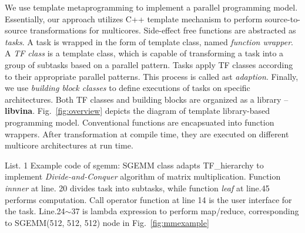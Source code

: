 We use template metaprogramming to implement a parallel programming model.
Essentially, our approach utilizes C++ template mechanism to
perform source-to-source transformations for multicores. Side-effect
free functions are abstracted as \emph{tasks}. A task is
wrapped in the form of template class, named \emph{function
  wrapper}.  A \emph{TF class} is a template class, which
is capable of transforming a task into a group of subtasks based on
a parallel pattern. Tasks
apply TF classes according to their appropriate
parallel patterns. This process is called ast \emph{adaption}. 
Finally, we use \emph{building block classes} to define executions of tasks
on specific architectures. Both TF classes and building
blocks are organized as a library --
\textbf{libvina}. Fig.~\ref{fig:overview} depicts the diagram of template
library-based programming model. Conventional functions are
encapsuated into function wrappers. After transformation at compile time, they are
executed on different multicore architectures at run time.

\renewcommand\linenumberfont{\normalfont\small}
\setlength\linenumbersep{-0.06in}





\makebox[3.4in]{\hrulefill}

List. 1 Example code of sgemm: SGEMM class adapts TF\_hierarchy
to implement \emph{Divide-and-Conquer} algorithm of matrix
multiplication. Function \textit{innner} at
line. 20 divides task into subtasks, while function \textit{leaf} at line.45 performs
computation. Call operator function at line 14 is the user interface for the task.
Line.24$\sim$37 is lambda expression to perform map/reduce, corresponding to
SGEMM(512, 512, 512) node in Fig.~\ref{fig:mmexample}\\

\makebox[3.4in]{\hrulefill}

